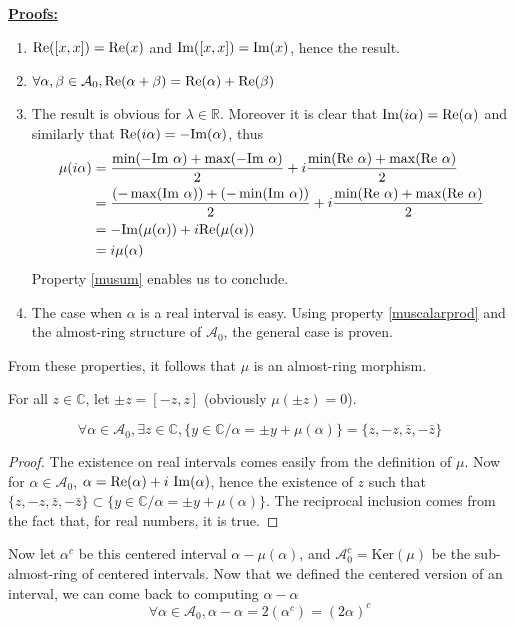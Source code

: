 \noindent\underline{\textbf{Proofs:}}
\begin{enumerate}[i]
    \item $\mathrm{Re}([x, x]) = \mathrm{Re}(x)$ and $\mathrm{Im}([x, x]) = \mathrm{Im}(x)$, hence the result.
    \item $\forall \alpha, \beta \in \mathcal{A}_0, \mathrm{Re}(\alpha + \beta) = \mathrm{Re}(\alpha) + \mathrm{Re}(\beta)$
    \item The result is obvious for $\lambda \in \mathbb{R}$.
    Moreover it is clear that $\mathrm{Im}(i \alpha) = \mathrm{Re}(\alpha)$ and similarly that $\mathrm{Re}(i \alpha) = - \mathrm{Im}(\alpha)$, thus
    \begin{align*}
        \mu(i\alpha) &= \frac{\min(-\mathrm{Im}~\alpha) + \max(-\mathrm{Im}~\alpha)}{2} + i \frac{\min(\mathrm{Re}~\alpha) + \max(\mathrm{Re}~\alpha)}{2} \\
        &= \frac{(-\max(\mathrm{Im}~\alpha)) + (-\min(\mathrm{Im}~\alpha))}{2} + i \frac{\min(\mathrm{Re}~\alpha) + \max(\mathrm{Re}~\alpha)}{2} \\
        &= - \mathrm{Im}(\mu(\alpha)) + i \mathrm{Re}(\mu(\alpha)) \\
        &= i \mu(\alpha)
    \end{align*}
    Property \ref{musum} enables us to conclude.
    \item The case when $\alpha$ is a real interval is easy. Using property \ref{muscalarprod} and the almost-ring structure of $\mathcal{A}_0$, the general case is proven.
    \hfill{} $\boxed{}$
\end{enumerate}

\noindent From these properties, it follows that $\mu$ is an almost-ring morphism.

For all $z \in \mathbb{C}$, let $\pm z = [-z, z]$ (obviously $\mu(\pm z) = 0$).
\begin{theorem}
    $$\forall \alpha \in \mathcal{A}_0, \exists z \in \mathbb{C}, \{y \in \mathbb{C} / \alpha = \pm y + \mu(\alpha)\} = \{z, -z, \bar{z}, -\bar z\}$$
\end{theorem}
\begin{proof}
    The existence on real intervals comes easily from the definition of $\mu$.
    Now for $\alpha \in \mathcal{A}_0$, $\alpha = \mathrm{Re}(\alpha) + i~\mathrm{Im}(\alpha)$, hence the existence of $z$ such that $\{z, -z, \bar{z}, -\bar z\} \subset \{y \in \mathbb{C} / \alpha = \pm y + \mu(\alpha)\}$.
    The reciprocal inclusion comes from the fact that, for real numbers, it is true.
\end{proof}

Now let $\alpha^c$ be this centered interval $\alpha - \mu(\alpha)$, and $\mathcal{A}_0^c = \text{Ker}(\mu)$ be the sub-almost-ring of centered intervals. Now that we defined the centered version of an interval, we can come back to computing $\alpha - \alpha$
$$\forall \alpha \in \mathcal{A}_0, \alpha - \alpha = 2(\alpha^c) = (2\alpha)^c$$

